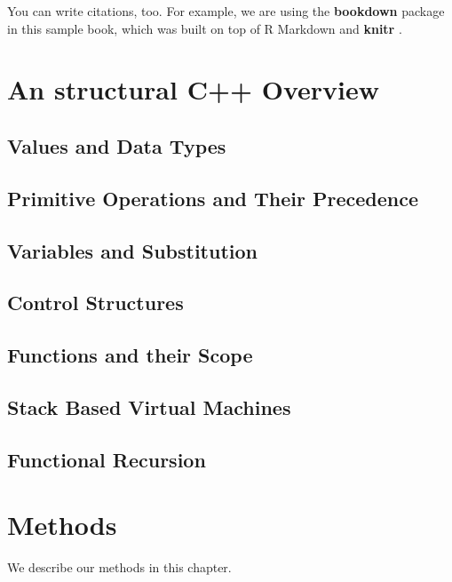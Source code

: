 \documentclass[]{book}
\begin{document}
You can write citations, too. For example, we are using the \textbf{bookdown} package \citep{R-bookdown} in this sample book, which was built on top of R Markdown and \textbf{knitr} \citep{xie2015}.

\hypertarget{an-structural-c-overview}{%
\chapter{An structural C++ Overview}\label{an-structural-c-overview}}

\hypertarget{values-and-data-types}{%
\section{Values and Data Types}\label{values-and-data-types}}

\hypertarget{primitive-operations-and-their-precedence}{%
\section{Primitive Operations and Their Precedence}\label{primitive-operations-and-their-precedence}}

\hypertarget{variables-and-substitution}{%
\section{Variables and Substitution}\label{variables-and-substitution}}

\hypertarget{control-structures}{%
\section{Control Structures}\label{control-structures}}

\hypertarget{functions-and-their-scope}{%
\section{Functions and their Scope}\label{functions-and-their-scope}}

\hypertarget{stack-based-virtual-machines}{%
\section{Stack Based Virtual Machines}\label{stack-based-virtual-machines}}

\hypertarget{functional-recursion}{%
\section{Functional Recursion}\label{functional-recursion}}

\hypertarget{methods}{%
\chapter{Methods}\label{methods}}

We describe our methods in this chapter.


\end{document}
